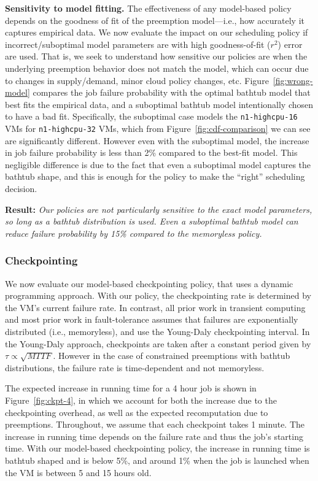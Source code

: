 \documentclass[sigconf]{acmart} %
\newcommand{\subsecspace}[0]{-0.20cm}
\begin{document}
\noindent \textbf{Sensitivity to model fitting.}
The effectiveness of any model-based policy depends on the goodness of fit of the preemption model---i.e., how accurately it captures empirical data. 
We now evaluate the impact on our scheduling policy if incorrect/suboptimal model parameters are with high goodness-of-fit ($r^2$) error are used. 
That is, we seek to understand how sensitive our policies are when the underlying preemption behavior does not match the model, which can occur due to changes in supply/demand, minor cloud policy changes, etc. 
Figure~\ref{fig:wrong-model} compares the job failure probability with the optimal bathtub model that best fits the empirical data, and a suboptimal  bathtub model intentionally chosen to have a bad fit. 
Specifically, the suboptimal case models the \texttt{n1-highcpu-16} VMs for \texttt{n1-highcpu-32} VMs, which from Figure~\ref{fig:cdf-comparison} we can see are significantly different.
However even with the suboptimal model, the increase in job failure probability is less than 2\% compared to the best-fit model. 
This negligible difference is due to the fact that even a suboptimal model captures the bathtub shape, and this is enough for the policy to make the ``right'' scheduling decision. 

\noindent \textbf{Result:} \emph{Our policies are not particularly sensitive to the exact model parameters, so long as a bathtub distribution is used. Even a suboptimal bathtub model can reduce failure probability by 15\% compared to the memoryless policy.} 

\vspace*{\subsecspace}
\subsubsection{Checkpointing}
\label{subsec:eval-ckpt}

We now evaluate our model-based checkpointing policy, that uses a dynamic programming approach.
With our policy, the checkpointing rate is determined by the VM's current failure rate.
In contrast, all prior work in transient computing and most prior work in fault-tolerance assumes that failures are exponentially distributed (i.e., memoryless), and use the Young-Daly checkpointing interval.
In the Young-Daly approach, checkpoints are taken after a constant period given by $\tau \propto \sqrt{MTTF}$.
However in the case of constrained preemptions with bathtub distributions, the failure rate is time-dependent and not memoryless. 


The expected increase in running time for a 4 hour job is shown in Figure~\ref{fig:ckpt-4}, in which we account for both the increase due to the checkpointing overhead, as well as the expected recomputation due to preemptions. 
Throughout, we assume that each checkpoint takes 1 minute. 
The increase in running time depends on the failure rate and thus the job's starting time. 
With our model-based checkpointing policy, the increase in running time is bathtub shaped and is below 5\%, and around 1\% when the job is launched when the VM is between 5 and 15 hours old. 
\end{document}
